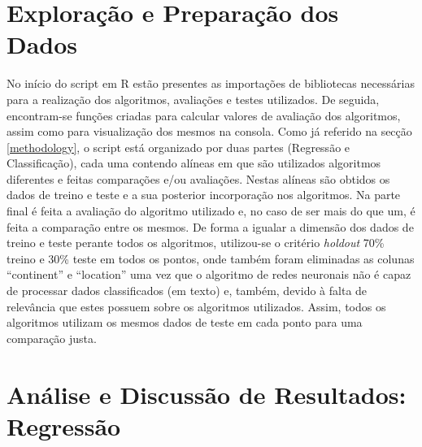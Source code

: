 \documentclass[conference]{IEEEtran}
\begin{document}
\section{Exploração e Preparação dos Dados} %
No início do script em R estão presentes as importações de bibliotecas necessárias para a realização dos algoritmos, avaliações e testes utilizados. De seguida, encontram-se funções criadas para calcular valores de avaliação dos algoritmos, assim como para visualização dos mesmos na consola.
Como já referido na secção \ref{methodology}, o script está organizado por duas partes (Regressão e Classificação), cada uma contendo alíneas em que são utilizados algoritmos diferentes e feitas comparações e/ou avaliações. Nestas alíneas são obtidos os dados de treino e teste e a sua posterior incorporação nos algoritmos. Na parte final é feita a avaliação do algoritmo utilizado e, no caso de ser mais do que um, é feita a comparação entre os mesmos.
De forma a igualar a dimensão dos dados de treino e teste perante todos os algoritmos, utilizou-se o critério \textit{holdout} 70\% treino e 30\% teste em todos os pontos, onde também foram eliminadas as colunas “continent” e “location” uma vez que o algoritmo de redes neuronais não é capaz de processar dados classificados (em texto) e, também, devido à falta de relevância que estes possuem sobre os algoritmos utilizados. Assim, todos os algoritmos utilizam os mesmos dados de teste em cada ponto para uma comparação justa.




\section{Análise e Discussão de Resultados: Regressão}
\label{regression} %
\end{document}
